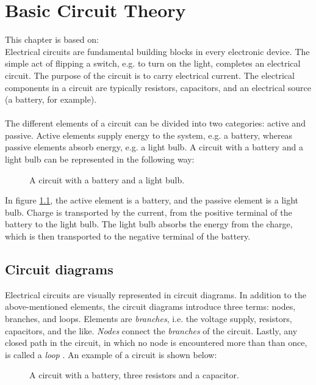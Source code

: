 \chapter{Basic Circuit Theory}
This chapter is based on: \cite{bcircuit} \cite{bcircuit5}\\
Electrical circuits are fundamental building blocks in every electronic device. The simple act of flipping a switch, e.g. to turn on the light, completes an electrical circuit. The purpose of the circuit is to carry electrical current. The electrical components in a circuit are typically resistors, capacitors, and an electrical source (a battery, for example).
\\ 
\\
The different elements of a circuit can be divided into two categories: active and passive. Active elements supply energy to the system, e.g. a battery, whereas passive elements absorb energy, e.g. a light bulb. A circuit with a battery and a light bulb can be represented in the following way:
\begin{figure}[H]

\caption{A circuit with a battery and a light bulb.}
\label{fig:bulb}
\end{figure} 
\noindent In figure \ref{fig:bulb}, the active element is a battery, and the passive element is a light bulb. Charge is transported by the current, from the positive terminal of the battery to the light bulb. The light bulb absorbs the energy from the charge, which is then transported to the negative terminal of the battery.
\\



\section{Circuit diagrams}
Electrical circuits are visually represented in circuit diagrams. In addition to the above-mentioned elements, the circuit diagrams introduce three terms: nodes, branches, and loops. Elements are \textit{branches}, i.e.  the voltage supply, resistors, capacitors, and the like. \textit{Nodes} connect the \textit{branches} of the circuit. Lastly, any closed path in the circuit, in which no node is encountered more than than once, is called a \textit{loop} \cite[p.~32]{bcircuit}. An example of a circuit is shown below:

\begin{figure}[H] 
 
 \caption{A circuit with a battery, three resistors and a capacitor.}
 \label{bcircuit_figure}
\end{figure}

